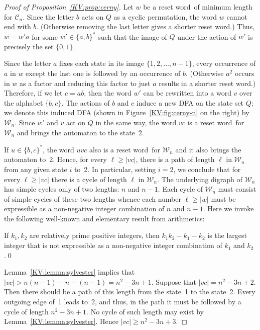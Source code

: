 \documentclass{irmaart}
\newcommand{\sw}{reset word}
\theoremstyle{plain}
\begin{document}
\begin{proof}[Proof of Proposition~\ref{KV:prop:cerny}]
Let $w$ be a \sw\ of minimum length for $\mathcal{C}_n$. Since the letter $b$
acts on $Q$ as a cyclic permutation, the word $w$ cannot end with $b$.
(Otherwise removing the last letter gives a shorter \sw.) Thus, $w = w'a$ for
some $w'\in\{a,b\}^*$ such that the image of $Q$ under the action of $w'$ is
precisely the set $\{0,1\}$.

Since the letter $a$ fixes each state in its image $\{1,2,\dots,n-1\}$, every
occurrence of $a$ in $w$ except the last one is followed by an occurrence of
$b$. (Otherwise $a^2$ occurs in $w$ as a factor and reducing this factor to
just $a$ results in a shorter \sw.) Therefore, if we let $c=ab$, then the word
$w'$ can be rewritten into a word $v$ over the alphabet $\{b,c\}$. The actions
of $b$ and $c$ induce a new DFA on the state set $Q$; we denote this induced
DFA (shown in Figure~\ref{KV:fig:cerny-n} on the right) by $\mathcal{W}_n$.
Since $w'$ and $v$ act on $Q$ in the same way, the word $vc$ is a \sw\ for
$\mathcal{W}_n$ and brings the automaton to the state~2.

If $u\in\{b,c\}^*$, the word $uvc$ also is a \sw\ for $\mathcal{W}_n$ and it
also brings the automaton to~2. Hence, for every $\ell\ge|vc|$, there is a path
of length $\ell$ in $\mathcal{W}_n$ from any given state $i$ to~2. In
particular, setting $i=2$, we conclude that for every $\ell\ge|vc|$ there is a
cycle of length $\ell$ in $\mathcal{W}_n$. The underlying digraph of
$\mathcal{W}_n$ has simple cycles only of two lengths: $n$ and $n-1$. Each
cycle of $\mathcal{W}_n$ must consist of simple cycles of these two lengths
whence each number $\ell\ge|w|$ must be expressible as a non-negative integer
combination of $n$ and $n-1$. Here we invoke the following well-known and
elementary result from arithmetics:

\begin{lemma}
\label{KV:lemma:sylvester} If $k_1,k_2$ are relatively prime positive integers,
then $k_1k_2-k_1-k_2$ is the largest integer that is not expressible as a
non-negative integer combination of $k_1$ and $k_2$.\qed
\end{lemma}

Lemma~\ref{KV:lemma:sylvester} implies that
$|vc|>n(n-1)-n-(n-1)=n^2-3n+1$. Suppose that $|vc|=n^2-3n+2$. Then
there should be a path of this length from the state~1 to the
state~2. Every outgoing edge of~1 leads to~2, and thus, in the
path it must be followed by a cycle of length $n^2-3n+1$. No cycle
of such length may exist by Lemma~\ref{KV:lemma:sylvester}. Hence
$|vc|\ge n^2-3n+3$.


\end{proof}
\end{document}
